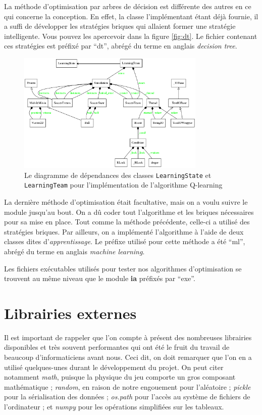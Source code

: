 \documentclass[12pt,a4paper]{article}
\begin{document}
La m\'ethode d'optimisation par arbres de d\'ecision est diff\'erente des 
autres en ce qui concerne la conception. En effet, la classe l'impl\'ementant 
\'etant d\'ej\`a fournie, il a suffi de d\'evelopper les strat\'egies briques 
qui allaient former une strat\'egie intelligente. Vous pouvez les apercevoir 
dans la figure \ref{fig:dt}. Le fichier contenant ces strat\'egies est 
pr\'efix\'e par \enquote{dt}, abr\'eg\'e du terme en anglais {\itshape 
decision tree}.

\begin{figure}[!h]
  \centering
  \captionsetup{justification=centering}
  \includegraphics[width=0.8\textwidth]{machineLearning_mod}
  \caption[Les classes pour l'apprentissage automatique]{Le diagramme de 
d\'ependances des classes \texttt{LearningState} et \texttt{LearningTeam} pour 
l'impl\'ementation de l'algorithme Q-learning}
  \label{fig:ml}
\end{figure}

La derni\`ere m\'ethode d'optimisation \'etait facultative, mais on a voulu 
suivre le module jusqu'au bout. On a d\^u coder tout l'algorithme et les 
briques n\'ecessaires pour sa mise en place. Tout comme la m\'ethode 
pr\'ec\'edente, celle-ci a utilis\'e des strat\'egies briques. Par ailleurs, on 
a impl\'ement\'e l'algorithme \`a l'aide de deux classes dites 
d'{\itshape apprentissage}.
Le pr\'efixe utilis\'e pour cette m\'ethode a \'et\'e \enquote{ml}, abr\'eg\'e 
du terme en anglais {\itshape machine learning}.

\medskip
Les fichiers ex\'ecutables utilis\'es pour tester nos algorithmes 
d'optimisation se trouvent au m\^eme niveau que le module {\bfseries ia} 
pr\'efix\'es par \enquote{exe}.

\section{Librairies externes}
Il est important de rappeler que l'on compte \`a pr\'esent des nombreuses 
librairies disponibles et tr\`es souvent performantes qui ont \'et\'e le fruit 
du travail de beaucoup d'informaticiens avant nous. Ceci dit, on doit remarquer 
que l'on en a utilis\'e quelques-unes durant le d\'eveloppement du projet. On 
peut citer notamment {\itshape math}, puisque la physique du jeu comporte un 
gros composant math\'ematique ; {\itshape random}, en raison de notre 
engouement pour l'al\'eatoire ; {\itshape pickle} pour la s\'erialisation des 
donn\'ees ; {\itshape os.path} pour l'acc\`es au syst\`eme de fichiers de 
l'ordinateur ; et {\itshape numpy} pour les op\'erations simplifi\'ees sur les 
tableaux.
\end{document}
